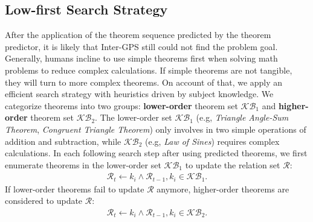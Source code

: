 \documentclass[11pt,a4paper]{article}
\begin{document}
\subsection{Low-first Search Strategy}

After the application of the theorem sequence predicted by the theorem predictor, it is likely that Inter-GPS still could not find the problem goal. Generally, humans incline to use simple theorems first when solving math problems to reduce complex calculations. If simple theorems are not tangible, they will turn to more complex theorems. On account of that, we apply an efficient search strategy with heuristics driven by subject knowledge. We categorize theorems into two groups: \textbf{lower-order} theorem set $\mathcal{KB}_1$ and \textbf{higher-order} theorem set $\mathcal{KB}_2$. The lower-order set $\mathcal{KB}_1$ (e.g, \textit{Triangle Angle-Sum Theorem}, \textit{Congruent Triangle Theorem}) only involves in two simple operations of addition and subtraction, while $\mathcal{KB}_2$ (e.g, \textit{Law of 
Sines}) requires complex calculations. In each following search step after using predicted theorems, we first enumerate theorems in the lower-order set $\mathcal{KB}_1$ to update the relation set $\mathcal{R}$:
\begin{equation}
\begin{split}
    \mathcal{R}_{t} \gets k_i \land \mathcal{R}_{t-1}, k_i \in \mathcal{KB}_1.
\end{split}
\end{equation}
If lower-order theorems fail to update $\mathcal{R}$ anymore, higher-order theorems are considered to update $\mathcal{R}$:
\begin{equation}
\begin{split}
    \mathcal{R}_{t} \gets k_i \land \mathcal{R}_{t-1}, k_i \in \mathcal{KB}_2.
\end{split}
\end{equation}

\end{document}
